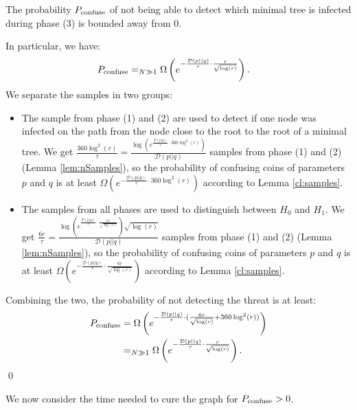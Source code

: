 \begin{corollary} \label{cor:Pconfuse} 
The probability $P_{\rm confuse}$ of not being able to detect which minimal tree is infected during phase (3) is bounded away from 0. 

In particular, we have:
\begin{align*}
P_{\rm confuse} &=_{N \gg 1} \Omega\left(e^{-\frac{\mathcal{D}(p||q)}{\tau} \cdot \frac{r}{\sqrt{\log(r)}} } \right).
\end{align*}
\proof We separate the samples in two groups:
\begin{itemize}
	\item The sample from phase (1) and (2) are used to detect if one node was infected on the path from the node close to the root to the root of a minimal tree. We get $\frac{360\log^2(r)}{\tau} = \frac{\log\left(e^{\frac{\mathcal{D}(p||q)}{\tau} \cdot 360\log^2(r) }\right) } {\mathcal{D}(p||q)}$ samples from phase (1) and (2) (Lemma \ref{lem:nSamples}), so the probability of confusing coins of parameters $p$ and $q$ is at least $ \Omega\left(e^{-\frac{\mathcal{D}(p||q)}{\tau} \cdot 360\log^2(r) } \right)$ according to Lemma \ref{cl:samples}.
	\item The samples from all phases are used to distinguish between $H_0$ and $H_1$. We get $\frac{6r}{\tau} = \frac{\log\left(e^{\frac{\mathcal{D}(p||q)}{\tau} \cdot \frac{6r}{\sqrt{\log(r)}} }\right) \sqrt{\log(r)} } {\mathcal{D}(p||q)}$ samples from phase (1) and (2) (Lemma \ref{lem:nSamples}), so the probability of confusing coins of parameters $p$ and $q$ is at least $ \Omega\left(e^{-\frac{\mathcal{D}(p||q)}{\tau} \cdot \frac{6r}{\sqrt{\log(r)} } } \right)$ according to Lemma \ref{cl:samples}.
\end{itemize}
Combining the two, the probability of not detecting the threat is at least:
\begin{align*}
	P_{\rm confuse} &= \Omega\left(e^{-\frac{\mathcal{D}(p||q)}{\tau} \cdot (\frac{6r}{\sqrt{\log(r)} } + 360\log^2(r))} \right) \\
	&=_{N \gg 1} \Omega\left(e^{-\frac{\mathcal{D}(p||q)}{\tau} \cdot \frac{r}{\sqrt{\log(r)} } } \right).
\end{align*}
\qed
\end{corollary}
We now consider the time needed to cure the graph for  $P_{\rm confuse} > 0$.


